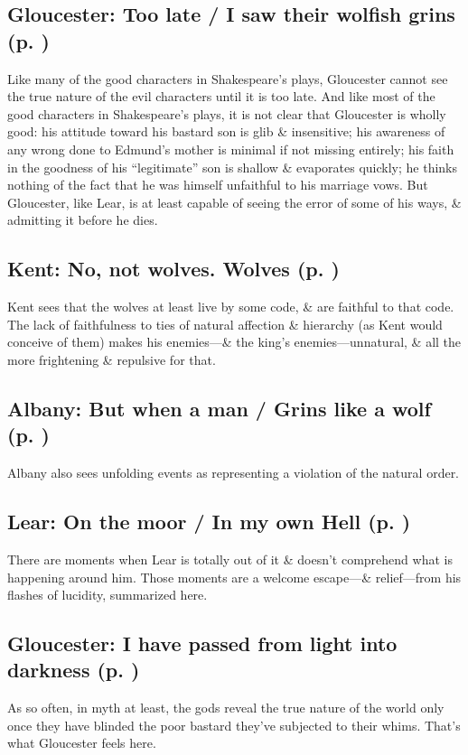 \subsection*{Gloucester: Too late / I saw their wolfish grins (p. \pageref{ch:lear_at})}

Like many of the good characters in Shakespeare's plays, Gloucester cannot see the true nature of the evil characters until it is too late. And like most of the good characters in Shakespeare's plays, it is not clear that Gloucester is wholly good: his attitude toward his bastard son is glib \& insensitive; his awareness of any wrong done to Edmund's mother is minimal if not missing entirely; his faith in the goodness of his ``legitimate'' son is shallow \& evaporates quickly; he thinks nothing of the fact that he was himself unfaithful to his marriage vows. But Gloucester, like Lear, is at least capable of seeing the error of some of his ways, \& admitting it before he dies.

\subsection*{Kent: No, not wolves. Wolves (p. \pageref{ch:lear_au})}
Kent sees that the wolves at least live by some code, \& are faithful to that code. The lack of faithfulness to ties of natural affection \& hierarchy (as Kent would conceive of them) makes his enemies---\& the king's enemies---unnatural, \& all the more frightening \& repulsive for that.

\subsection*{Albany: But when a man / Grins like a wolf (p. \pageref{ch:lear_av})}
Albany also sees unfolding events as representing a violation of the natural order.

\subsection*{Lear: On the moor / In my own Hell (p. \pageref{ch:lear_aw})}
There are moments when Lear is totally out of it \& doesn't comprehend what is happening around him. Those moments are a welcome escape---\& relief---from his flashes of lucidity, summarized here.

\subsection*{Gloucester: I have passed from light into darkness (p. \pageref{ch:lear_ax})}
As so often, in myth at least, the gods reveal the true nature of the world only once they have blinded the poor bastard they've subjected to their whims. That's what Gloucester feels here.

